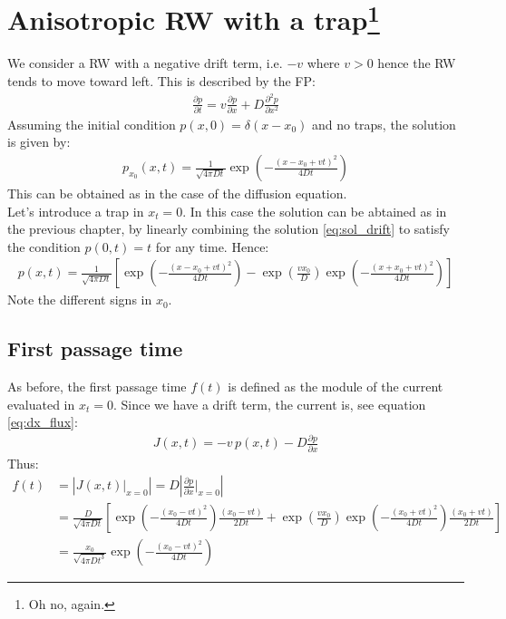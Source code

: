 \documentclass[4apaper,11pt,fleqn]{article}
\theoremstyle{remark}
\theoremstyle{definition}
\begin{document}
\section[Anisotropic RW with a trap]{Anisotropic RW with a trap\footnote{Oh no, again.}}
We consider a RW with a negative drift term, i.e. $-v $ where $v>0$ hence the RW tends to move toward left. This is described by the FP:
\begin{align*}
  \frac{\partial p}{\partial t}=v \frac{\partial p}{\partial x}+D \frac{\partial^{2} p}{\partial x^{2}}
\end{align*}
Assuming the initial condition $p(x,0)=\delta (x-x_0)$  and no traps, the solution is given by:
\begin{align}
  \label{eq:sol_drift}
  p_{x_{0}}(x, t)=\frac{1}{\sqrt{4 \pi D t}} \exp \left(-\frac{\left(x-x_{0}+v t\right)^{2}}{4 D t}\right)
\end{align}
This can be obtained as in the case of the diffusion equation.\\
Let's introduce a trap in $x_t=0$. In this case the solution  can be abtained as in the previous chapter, by linearly combining the solution \eqref{eq:sol_drift} to satisfy the condition $p(0,t)=t$ for any time.
Hence:
\begin{align*}
  p(x, t)=\frac{1}{\sqrt{4 \pi D t}}\left[\exp \left(-\frac{\left(x-x_{0}+v t\right)^{2}}{4 D t}\right)-\exp \left(\frac{v x_{0}}{D}\right) \exp \left(-\frac{\left(x+x_{0}+v t\right)^{2}}{4 D t}\right)\right]
\end{align*}
Note the different signs in $x_0$.


\subsection{First passage time}
As before, the first passage time $f(t)$ is defined as the module of the current evaluated in $x_t=0$. Since we have a drift term, the current is, see equation \eqref{eq:dx_flux}:
\begin{align*}
  J(x,t) = -v\, p(x,t) -D \frac{\partial p}{\partial x}
\end{align*}
Thus:
\begin{align*}
  f (t) &= \left|  J(x,t) \Bigr|_{x=0} \right| = D \left| \frac{\partial p}{\partial x} \Bigr|_{x=0} \right| \\
        &= \frac{D}{\sqrt{4 \pi D t}}\left[\exp \left(-\frac{\left(x_{0}-v t\right)^{2}}{4 D t}\right) \frac{\left(x_{0}-v t\right)}{2 D t}+ \exp \left(\frac{v x_{0}}{D}\right) \exp \left(-\frac{\left(x_{0}+v t\right)^{2}}{4 D t}\right) \frac{\left(x_{0}+v t\right)}{2 D t}\right] \\
        &= \frac{x_{0}}{\sqrt{4 \pi D t^{3}}} \exp \left(-\frac{\left(x_{0}-v t\right)^{2}}{4 D t}\right)
\end{align*}
\end{document}
